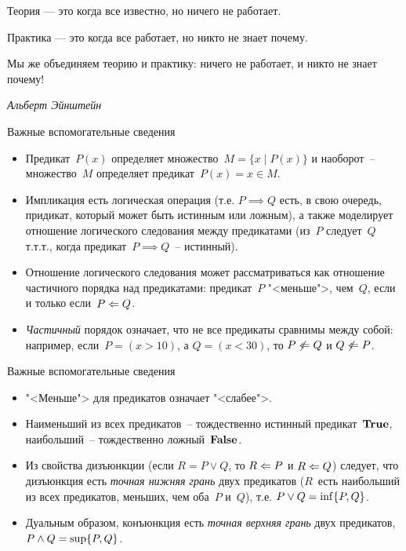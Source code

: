 \documentclass[landscape]{slides}
\begin{document}
\begin{slide}
\begin{Large}
Теория — это когда все известно, но ничего не работает.

Практика — это когда все работает, но никто не знает почему.

Мы же объединяем теорию и практику: ничего не работает, и никто не знает почему!
\end{Large}

\begin{flushright}
\emph{Альберт Эйнштейн}
\end{flushright}
\end{slide}

\begin{slide}
        Важные вспомогательные сведения
        \begin{itemize}
                \item Предикат~$P(x)$ определяет множество~$M=\{x\mid P(x)\}$ и наоборот~-- множество~$M$
                        определяет предикат~$P(x) = x\in M$.
                \item Импликация есть логическая операция (т.е. $P\implies Q$ есть, в свою очередь,
                        придикат, который может быть истинным или ложным), а также моделирует отношение логического
                        следования между предикатами (из~$P$ следует~$Q$ т.т.т., когда предикат~$P\implies Q$~-- истинный).
                \item Отношение логического следования может рассматриваться как отношение частичного порядка
                        над предикатами: предикат~$P$ "<меньше">, чем~$Q$, если и только если~$P\Leftarrow Q$.
                \item \emph{Частичный} порядок означает, что не все предикаты сравнимы между собой: например,
                        если~$P=(x>10)$, а $Q=(x<30)$, то $P\not\Leftarrow Q$ и $Q\not\Leftarrow P$.
        \end{itemize}
\end{slide}

\begin{slide}
        Важные вспомогательные сведения
        \begin{itemize}
                \item "<Меньше"> для предикатов означает "<слабее">.
                \item Наименьший из всех предикатов~-- тождественно истинный предикат~$\mathbf{True}$, наибольший~--
                        тождественно ложный~$\mathbf{False}$.
                \item Из свойства дизъюнкции (если $R=P\lor Q$, то $R\Leftarrow P$ и $R\Leftarrow Q$) следует, что
                        дизъюнкция есть \emph{точная нижняя грань} двух предикатов ($R$~есть наибольший из всех
                        предикатов, меньших, чем оба~$P$ и~$Q$), т.е. $P\lor Q = \mathrm{inf}\{P, Q\}$.
                \item Дуальным образом, конъюнкция есть \emph{точная верхняя грань} двух предикатов,
                        $P\land Q = \mathrm{sup}\{P, Q\}$.
        \end{itemize}
\end{slide}
\end{document}
